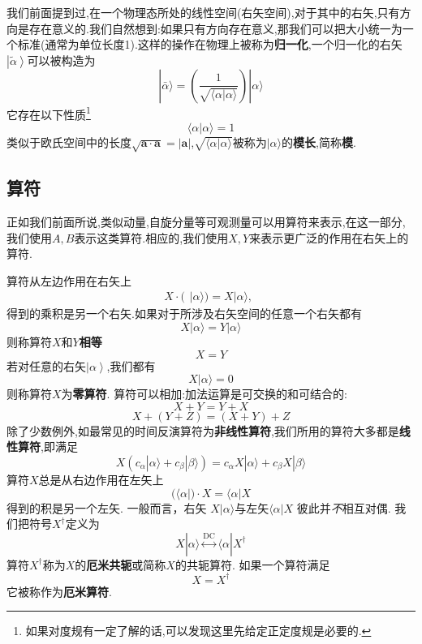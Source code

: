\documentclass[lang=cn,newtx,10pt,scheme=chinese,thmcnt=section]{elegantbook}
\begin{document}
我们前面提到过,在一个物理态所处的线性空间(右矢空间),对于其中的右矢,只有方向是存在意义的.我们自然想到:如果只有方向存在意义,那我们可以把大小统一为一个标准(通常为单位长度1).这样的操作在物理上被称为\textbf{归一化},一个归一化的右矢$\left|\tilde{\alpha}\right\rangle $可以被构造为
\begin{equation}
	|\bar{\alpha}\rangle=\left(\frac1{\sqrt{\langle\alpha|\alpha\rangle}}\right)|\alpha\rangle
\end{equation}
它存在以下性质\footnote{如果对度规有一定了解的话,可以发现这里先给定正定度规是必要的.}
\begin{equation}
	\langle\alpha|\alpha\rangle=1
\end{equation}
类似于欧氏空间中的长度$\sqrt{\mathbf{a}\cdot\mathbf{a}}=|\mathbf{a}|$,$\sqrt{\langle\alpha|\alpha\rangle}$被称为$|\alpha\rangle$的\textbf{模长},简称\textbf{模}.

\subsection*{算符}
正如我们前面所说,类似动量,自旋分量等可观测量可以用算符来表示,在这一部分,我们使用$A,B$表示这类算符.相应的,我们使用$X,Y$来表示更广泛的作用在右矢上的算符.

算符从左边作用在右矢上
$$X\cdot(\begin{array}{c}|\alpha\rangle)=X|\alpha\rangle,\end{array}$$
得到的乘积是另一个右矢.如果对于所涉及右矢空间的任意一个右矢都有
$$X|\alpha\rangle=Y|\alpha\rangle$$
则称算符$X$和$Y$\textbf{相等}
$$X=Y$$
若对任意的右矢$\left|\alpha\right\rangle$,我们都有
$$X|\alpha\rangle=0$$
则称算符$X$为\textbf{零算符}. 算符可以相加:加法运算是可交换的和可结合的:
$$X+Y=Y+X$$
$$X+(Y+Z)=(X+Y)+Z$$
除了少数例外,如最常见的时间反演算符为\textbf{非线性算符},我们所用的算符大多都是\textbf{线性算符},即满足
\begin{equation}
	X(c_\alpha|\alpha\rangle+c_\beta|\beta\rangle)=c_\alpha X|\alpha\rangle+c_\beta X|\beta\rangle 
\end{equation}
算符$X$总是从右边作用在左矢上
\begin{equation}
	(\langle\alpha|)\cdot X=\langle\alpha|X
\end{equation}
得到的积是另一个左矢. 一般而言，右矢 $X|\alpha\rangle$与左矢$\langle\alpha|X$ 彼此并\textit{不}相互对偶. 我们把符号$X^\dagger$定义为
\begin{equation}
	X|\alpha\rangle\overset{\mathrm{DC}}{\operatorname*{\leftrightarrow}}\langle\alpha| X^\dagger
\end{equation}
算符$X^\dagger$称为$X$的\textbf{厄米共轭}或简称$X$的共轭算符. 如果一个算符满足
\begin{equation}
	X=X^\dagger
\end{equation}
它被称作为\textbf{厄米算符}.
\end{document}
